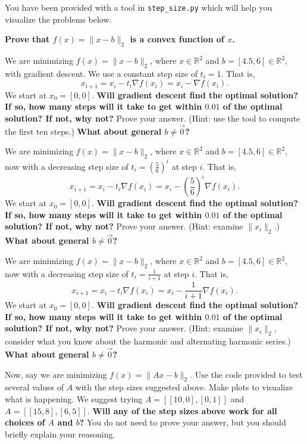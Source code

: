 You have been provided with a tool in \texttt{step\_size.py} which will help you visualize the problems below.

\begin{Parts}

\Part \textbf{Prove that $f(x) = \|x-b\|_2$ is a convex function of $x$.}




\Part We are minimizing $f(x) = \|x-b\|_2$, where $x \in \mathbb{R}^2$ and $b = [4.5, 6] \in \mathbb{R}^2$, with gradient descent. We use a constant step size of $t_i = 1$. That is, 
$$x_{i+1} = x_i - t_i \nabla f(x_i) = x_i - \nabla f(x_i).$$ 
We start at $x_0 = [0, 0].$ \textbf{Will gradient descent find the optimal solution? If so, how many steps will it take to get within $0.01$ of the optimal solution? If not, why not?} Prove your answer. (Hint: use the tool to compute the first ten steps.) 
\textbf{What about general $b \neq \vec{0}$?}




\Part We are minimizing $f(x) = \|x-b\|_2$, where $x \in \mathbb{R}^2$ and $b = [4.5, 6] \in \mathbb{R}^2$, now with a decreasing step size of $t_i = (\frac{5}{6})^i$ at step $i$. That is, 
$$x_{i+1} = x_i - t_i \nabla f(x_i) = x_i - (\frac{5}{6})^i \nabla f(x_i).$$ 
We start at $x_0 = [0, 0].$ \textbf{Will gradient descent find the optimal solution? If so, how many steps will it take to get within $0.01$ of the optimal solution? If not, why not?} Prove your answer. (Hint: examine $\|x_i\|_2$.)
\textbf{What about general $b \neq \vec{0}$?}




\Part We are minimizing $f(x) = \|x-b\|_2$, where $x \in \mathbb{R}^2$ and $b = [4.5, 6] \in \mathbb{R}^2$, now with a decreasing step size of $t_i = \frac{1}{i+1}$ at step $i$. That is, 
$$x_{i+1} = x_i - t_i \nabla f(x_i) = x_i - \frac{1}{i+1} \nabla f(x_i).$$
We start at $x_0 = [0, 0].$ \textbf{Will gradient descent find the optimal solution? If so, how many steps will it take to get within $0.01$ of the optimal solution? If not, why not?} Prove your answer. (Hint: examine $\|x_i\|_2$, consider what you know about the harmonic and alternating harmonic series.)
\textbf{What about general $b \neq \vec{0}$?}




\Part Now, say we are minimizing $f(x) = \|Ax-b\|_2$. Use the code provided to test several values of $A$ with the step sizes suggested above. Make plots to visualize what is happening. We suggest trying $A = [[10, 0], [0, 1]]$ and $A = [[15, 8], [6, 5]]$. \textbf{Will any of the step sizes above work for all choices of $A$ and $b$?} You do not need to prove your answer, but you should briefly explain your reasoning.



\end{Parts}

